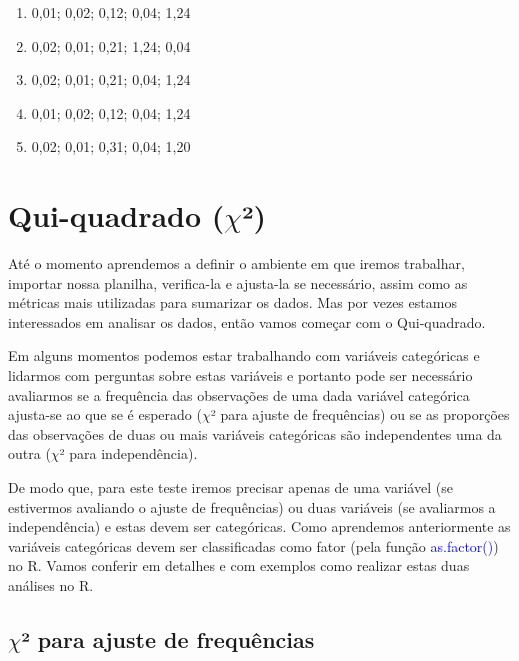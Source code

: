 \documentclass[14pt,titlepage, oneside, openany, a4paper]{book}
\providecommand{\tightlist}{%
  \setlength{\itemsep}{0pt}\setlength{\parskip}{0pt}}
\begin{document}
\begin{enumerate}
\def\labelenumi{(\alph{enumi})}
\tightlist
\item
  0,01; 0,02; 0,12; 0,04; 1,24
\item
  0,02; 0,01; 0,21; 1,24; 0,04
\item
  0,02; 0,01; 0,21; 0,04; 1,24
\item
  0,01; 0,02; 0,12; 0,04; 1,24
\item
  0,02; 0,01; 0,31; 0,04; 1,20
\end{enumerate}

\hypertarget{qui-quadrado-chi}{%
\chapter{\texorpdfstring{Qui-quadrado (\(\chi\)²)}{Qui-quadrado (\textbackslash{}chi²)}}\label{qui-quadrado-chi}}

Até o momento aprendemos a definir o ambiente em que iremos trabalhar, importar nossa planilha, verifica-la e ajusta-la se necessário, assim como as métricas mais utilizadas para sumarizar os dados. Mas por vezes estamos interessados em analisar os dados, então vamos começar com o Qui-quadrado.

Em alguns momentos podemos estar trabalhando com variáveis categóricas e lidarmos com perguntas sobre estas variáveis e portanto pode ser necessário avaliarmos se a frequência das observações de uma dada variável categórica ajusta-se ao que se é esperado (\(\chi\)² para ajuste de frequências) ou se as proporções das observações de duas ou mais variáveis categóricas são independentes uma da outra (\(\chi\)² para independência).

De modo que, para este teste iremos precisar apenas de uma variável (se estivermos avaliando o ajuste de frequências) ou duas variáveis (se avaliarmos a independência) e estas devem ser categóricas. Como aprendemos anteriormente as variáveis categóricas devem ser classificadas como fator (pela função \textcolor{blue}{as.factor()}) no R. Vamos conferir em detalhes e com exemplos como realizar estas duas análises no R.

\hypertarget{chi-para-ajuste-de-frequuxeancias}{%
\section{\texorpdfstring{\(\chi\)² para ajuste de frequências}{\textbackslash{}chi² para ajuste de frequências}}\label{chi-para-ajuste-de-frequuxeancias}}
\end{document}
